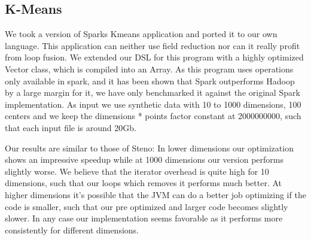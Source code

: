 \subsection{K-Means}
\label{subsec:kmeans}
We took a version of Sparks Kmeans application and ported it to our own language. This application can neither use field reduction nor can it really profit from loop fusion. We extended our DSL for this program with a highly optimized Vector class, which is compiled into an Array. As this program uses operations only available in spark, and it has been shown that Spark outperforms Hadoop by a large margin for it, we have only benchmarked it against the original Spark implementation. As input we use synthetic data with 10 to 1000 dimensions, 100 centers and we keep the dimensions * points factor constant at 2000000000, such that each input file is around 20Gb. 

Our results are similar to those of Steno: In lower dimensions our optimization shows an impressive speedup while at 1000 dimensions our version performs slightly worse. We believe that the iterator overhead is quite high for 10 dimensions, such that our loops which removes it performs much better. At higher dimensions it's possible that the JVM can do a better job optimizing if the code is smaller, such that our pre optimized and larger code becomes slightly slower. In any case our implementation seems favorable as it performs more consistently for different dimensions.
